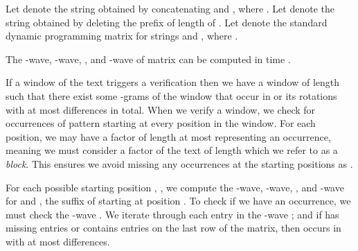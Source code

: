 \documentclass[runningheads, envcountsame, a4paper]{llncs}\usepackage{etex}
\begin{document}
Let  denote the string obtained by 
concatenating  and , where .
Let  denote the string obtained by deleting the 
prefix of length  of .
Let  denote the standard dynamic 
programming matrix for strings  and 
, where .

\begin{theorem}
The -wave, -wave,  , and -wave of matrix  can be computed in time .
\label{the:Hsu}
\end{theorem}

If a window of the text triggers a verification then we have a window of length  such that there exist some -grams of the window that occur in  or its rotations with at most  differences in total. When we verify a window, we check for occurrences of pattern  starting at every position in the window. For each position, we may have a factor of length at most  representing an occurrence, meaning we must consider a factor  of the text of length  which we refer to as a \textit{block}. This ensures we avoid missing any occurrences at the  starting positions as .

For each possible starting position , , we compute the -wave, -wave,  , and -wave for  
and , the suffix of  starting at position . To check if we have an occurrence, we must check the -wave . 
We iterate through each entry in the -wave ; and if  has missing entries or contains entries on the last row of the matrix, then  occurs in  with at most  differences. 
\end{document}
